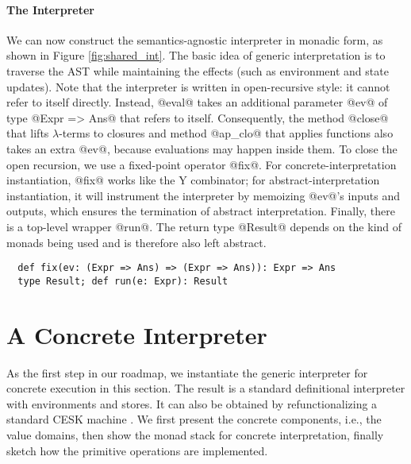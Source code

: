 \paragraph{The Interpreter} We can now construct the semantics-agnostic interpreter
in monadic form, as shown in Figure \ref{fig:shared_int}. The basic idea
of generic interpretation is to traverse the AST
while maintaining the effects (such as environment and state updates).
Note that the interpreter is written in open-recursive style: it cannot
refer to itself directly. Instead, @eval@ takes an additional parameter @ev@ of
type @Expr => Ans@ that refers to itself. Consequently, the method @close@ that
lifts $\lambda$-terms to closures and method @ap_clo@ that applies functions also
takes an extra @ev@, because evaluations may happen inside them.
To close the open recursion, we use a fixed-point operator @fix@.
For concrete-interpretation instantiation, @fix@ works like the Y combinator;
for abstract-interpretation instantiation, it will instrument the interpreter
by memoizing @ev@'s inputs and outputs, which ensures the termination of
abstract interpretation.
Finally, there is a top-level wrapper @run@. The return type @Result@
depends on the kind of monads being used and is therefore also left abstract.
\begin{lstlisting}
  def fix(ev: (Expr => Ans) => (Expr => Ans)): Expr => Ans
  type Result; def run(e: Expr): Result
\end{lstlisting}


\section{A Concrete Interpreter} \label{unstaged_conc}

As the first step in our roadmap, we instantiate the generic interpreter for
concrete execution in this section. The result is a standard definitional
interpreter with environments and stores. It can also be obtained by
refunctionalizing a standard CESK machine \cite{Felleisen:1987:CAH:41625.41654,
DBLP:conf/ppdp/AgerBDM03}. We first present the concrete components, i.e., the
value domains, then show the monad stack for concrete interpretation, finally
sketch how the primitive operations are implemented.

